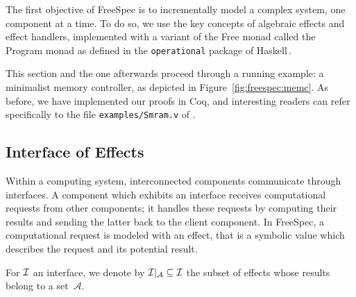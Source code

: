 The first objective of FreeSpec is to incrementally model a complex system, one
component at a time.
%
To do so, we use the key concepts of algebraic effects and effect handlers,
implemented with a variant of the Free monad called the Program monad as defined
in the \texttt{operational} package of Haskell\,\cite{operational}.

This section and the one afterwards proceed through a running example: a
minimalist memory controller, as depicted in Figure~\ref{fig:freespec:memc}.
%
As before, we have implemented our proofs in Coq, and interesting readers can
refer specifically to the file \texttt{examples/Smram.v} of
\cite{letan2018freespeccode}.

%

\subsection{Interface of Effects}

Within a computing system, interconnected components communicate through
interfaces.
%
A component which exhibits an interface receives computational requests from
other components; it handles these requests by computing their results and
sending the latter back to the client component.
%
In FreeSpec, a computational request is modeled with an effect, that is a
symbolic value which describes the request and its potential result.

For $\mathcal{I}$ an interface, we denote by $\mathcal{I}|_{\mathcal{A}} \subseteq \mathcal{I}$
the subset of effects whose results belong to a set~$\mathcal{A}$.

